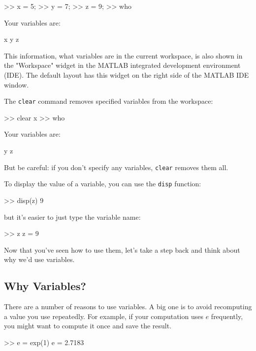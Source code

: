 
\begin{code}
>> x = 5;
>> y = 7;
>> z = 9;
>> who

Your variables are:

x  y  z
\end{code}

This information, what variables are in the current workspace, is also shown in the "Workspace" widget in the MATLAB integrated development environment (IDE).  The default layout has this widget on the right side of the MATLAB IDE window.

The \lstinline{clear} command removes specified variables from the workspace:

\begin{code}
>> clear x
>> who

Your variables are:

y z
\end{code}

But be careful: if you don't specify any variables, \lstinline{clear} removes them all.


To display the value of a variable, you can use the \lstinline{disp} function:

\begin{code}
>> disp(z)
     9
\end{code}
but it's easier to just type the variable name:

\begin{code}
>> z
z = 9
\end{code}

Now that you've seen how to use them, let's take a step back and think about why we'd use variables.

\subsection{Why Variables?}

There are a number of reasons to use variables.
A big one is to avoid recomputing a value you use repeatedly.  For
example, if your computation uses $e$ frequently, you might
want to compute it once and save the result.

\begin{code}
>> e = exp(1)
e = 2.7183
\end{code}

